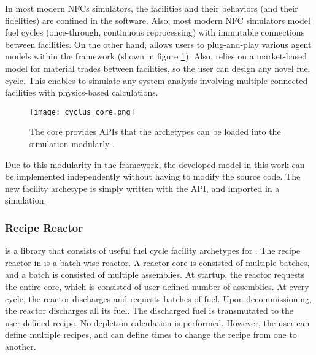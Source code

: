 In most modern \glspl{NFC} simulators, the facilities and their
behaviors (and their fidelities) are confined in the software.
Also, most modern \gls{NFC} simulators model
fuel cycles (once-through, continuous reprocessing)
with immutable connections between facilities. On the
other hand, \Cyclus allows users to plug-and-play various agent models
within the \Cyclus framework (shown in figure \ref{fig:core}).
Also, \Cyclus relies on a market-based model
for material trades between facilities, so the user can design
any novel fuel cycle. This enables \Cyclus to simulate any system analysis
involving multiple connected facilities with physics-based
calculations.


\begin{figure}[htbp!]
    \begin{center}
        \texttt{[image: cyclus\_core.png]}
    \end{center}
    \caption{The \Cyclus core provides APIs that the archetypes
            can be loaded into the simulation modularly
            \cite{huff_fundamental_2016}.}
    \label{fig:core}
\end{figure}

Due to this modularity in the \Cyclus framework, the developed
model in this work can be implemented independently without
having to modify the \Cyclus source code. The new facility archetype
is simply written with the \Cyclus API, and imported in a
\Cyclus simulation.

\subsubsection{\Cycamore Recipe Reactor}
\Cycamore is a library that consists of useful
fuel cycle facility archetypes for \Cyclus. The
recipe reactor in \Cycamore is a batch-wise reactor.
A reactor core is consisted of multiple batches,
and a batch is consisted of multiple assemblies.
At startup, the reactor requests the entire core,
which is consisted of user-defined number of assemblies.
At every cycle, the reactor discharges and
requests batches of fuel. Upon decommissioning,
the reactor discharges all its fuel. The discharged
fuel is transmutated to the user-defined recipe.
No depletion calculation is performed. However,
the user can define multiple recipes, and can define
times to change the recipe from one to another.
